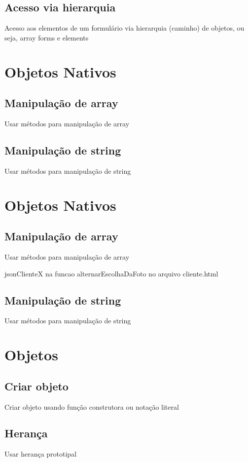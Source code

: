 \subsection{Acesso via hierarquia}
Acesso aos elementos de um formulário via hierarquia (caminho) de objetos, ou seja, array forms e elements



\section{Objetos Nativos }
\subsection{Manipulação de array}
Usar métodos para manipulação de array
\subsection{Manipulação de string}
Usar métodos para manipulação de string

\section{Objetos Nativos}
\subsection{Manipulação de array}
Usar métodos para manipulação de array

jsonClienteX na funcao alternarEscolhaDaFoto no arquivo cliente.html



\subsection{Manipulação de string}


Usar métodos para manipulação de string


\section{Objetos}
\subsection{Criar objeto}
Criar objeto usando função construtora ou notação literal


\subsection{Herança}
Usar herança prototipal


